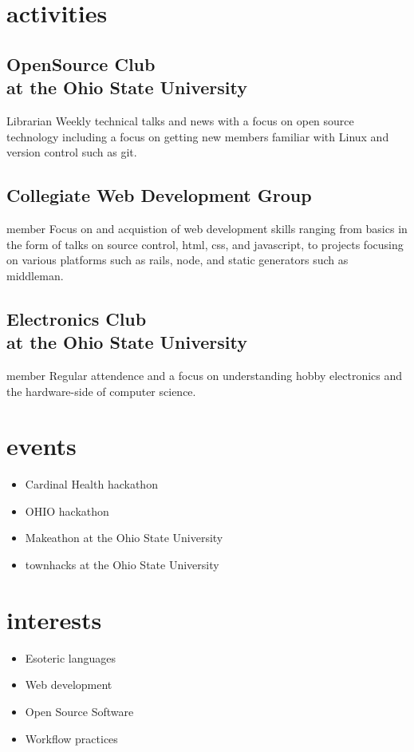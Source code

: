 \documentclass[letterpaper]{cv}
\begin{document}
	\section{activities}

	\subsection{OpenSource Club\\ at the Ohio State University}{Librarian}{}
			Weekly technical talks and news with a focus on open source technology including a focus on getting new members familiar with Linux and version control such as git.

			\subsection{Collegiate Web Development Group}{member}{}
			Focus on and acquistion of web development skills ranging from basics in the form of talks on source control, html, css, and javascript, to projects focusing on various platforms such as rails, node, and static generators such as middleman.

			\subsection{Electronics Club\\ at the Ohio State University}{member}{}
			Regular attendence and a focus on understanding hobby electronics and the hardware-side of computer science.

	\section{events}
		\begin{itemize}
			\item Cardinal Health hackathon
			\item OHIO hackathon
			\item Makeathon at the Ohio State University
			\item townhacks at the Ohio State University
		\end{itemize}

	\section{interests}
		\begin{itemize}
			\item Esoteric languages
			\item Web development
			\item Open Source Software
			\item Workflow practices
		\end{itemize}
		
\end{document}
